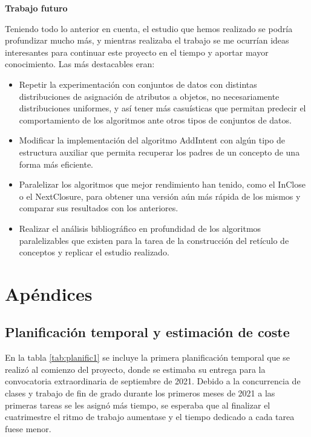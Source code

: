\documentclass[oneside,openright,titlepage,numbers=noenddot,openany,headinclude,footinclude=true,
cleardoublepage=empty,abstractoff,BCOR=5mm,paper=a4,fontsize=12pt,main=spanish]{scrreprt}
\begin{document}
\textbf{Trabajo futuro}

Teniendo todo lo anterior en cuenta, el estudio que hemos realizado se podría profundizar mucho más, y mientras realizaba el trabajo se me ocurrían ideas interesantes para continuar este proyecto en el tiempo y aportar mayor conocimiento. Las más destacables eran:

\begin{itemize}
    \item Repetir la experimentación con conjuntos de datos con distintas distribuciones de asignación de atributos a objetos, no necesariamente distribuciones uniformes, y así tener más casuísticas que permitan predecir el comportamiento de los algoritmos ante otros tipos de conjuntos de datos.
    
    \item Modificar la implementación del algoritmo AddIntent con algún tipo de estructura auxiliar que permita recuperar los padres de un concepto de una forma más eficiente.
    
    \item Paralelizar los algoritmos que mejor rendimiento han tenido, como el InClose o el NextClosure, para obtener una versión aún más rápida de los mismos y comparar sus resultados con los anteriores.
    
    \item Realizar el análisis bibliográfico en profundidad de los algoritmos paralelizables que existen para la tarea de la construcción del retículo de conceptos y replicar el estudio realizado.
\end{itemize}







\appendix
\renewcommand{\thechapter}{\Alph{chapter}}
\ctparttext{
  \color{red}
  \begin{center}
    
  \end{center}
}
\part*{Apéndices}

\chapter{Planificación temporal y estimación de coste}
\label{apendicea}
En la tabla \ref{tab:planific1} se incluye la primera planificación temporal que se realizó al comienzo del proyecto, donde se estimaba su entrega para la convocatoria extraordinaria de septiembre de 2021. Debido a la concurrencia de clases y trabajo de fin de grado durante los primeros meses de 2021 a las primeras tareas se les asignó más tiempo, se esperaba que al finalizar el cuatrimestre el ritmo de trabajo aumentase y el tiempo dedicado a cada tarea fuese menor.
\end{document}
